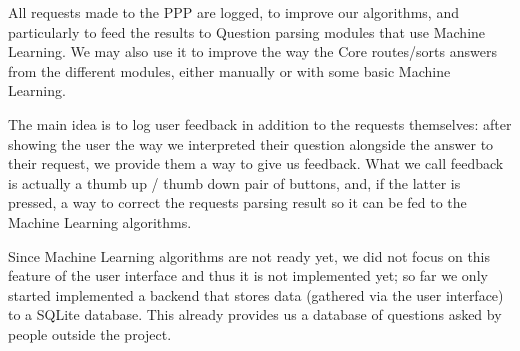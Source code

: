 All requests made to the PPP are logged, to improve our algorithms,
and particularly to feed the results to Question parsing
modules that use Machine Learning.
We may also use it to improve the way the Core routes/sorts answers
from the different modules, either manually or with some basic
Machine Learning.

The main idea is to log user feedback in addition to the requests
themselves: after showing the user the way we interpreted their
question alongside the answer to their request, we provide them a
way to give us feedback.
What we call feedback is actually a thumb up / thumb down pair of
buttons, and, if the latter is pressed, a way to correct the requests
parsing result so it can be fed to the Machine Learning algorithms.

Since Machine Learning algorithms are not ready yet, we did not focus
on this feature of the user interface and thus it is not implemented yet;
so far we only started implemented a backend that stores data
(gathered via the user interface) to a SQLite database.
This already provides us a database of questions asked by people
outside the project.
